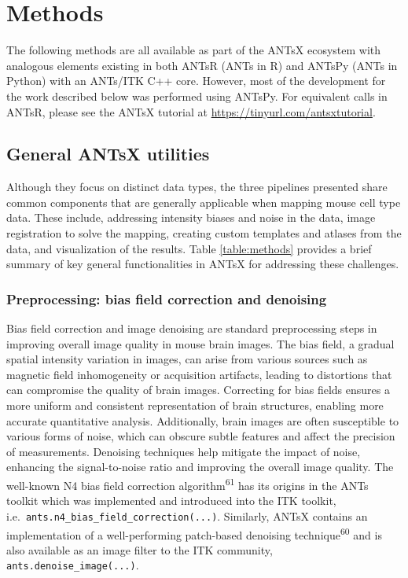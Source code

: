 \documentclass[
  12pt,
]{article}
\begin{document}
\clearpage
\newpage

\section{Methods}\label{methods}

The following methods are all available as part of the ANTsX ecosystem
with analogous elements existing in both ANTsR (ANTs in R) and ANTsPy
(ANTs in Python) with an ANTs/ITK C++ core. However, most of the
development for the work described below was performed using ANTsPy. For
equivalent calls in ANTsR, please see the ANTsX tutorial at
\url{https://tinyurl.com/antsxtutorial}.

\subsection{General ANTsX utilities}\label{general-antsx-utilities}

Although they focus on distinct data types, the three pipelines
presented share common components that are generally applicable when
mapping mouse cell type data. These include, addressing intensity biases
and noise in the data, image registration to solve the mapping, creating
custom templates and atlases from the data, and visualization of the
results. Table \ref{table:methods} provides a brief summary of key
general functionalities in ANTsX for addressing these challenges.



\subsubsection{Preprocessing: bias field correction and
denoising}\label{preprocessing-bias-field-correction-and-denoising}

Bias field correction and image denoising are standard preprocessing
steps in improving overall image quality in mouse brain images. The bias
field, a gradual spatial intensity variation in images, can arise from
various sources such as magnetic field inhomogeneity or acquisition
artifacts, leading to distortions that can compromise the quality of
brain images. Correcting for bias fields ensures a more uniform and
consistent representation of brain structures, enabling more accurate
quantitative analysis. Additionally, brain images are often susceptible
to various forms of noise, which can obscure subtle features and affect
the precision of measurements. Denoising techniques help mitigate the
impact of noise, enhancing the signal-to-noise ratio and improving the
overall image quality. The well-known N4 bias field correction
algorithm\textsuperscript{61} has its origins in the ANTs toolkit which
was implemented and introduced into the ITK toolkit,
i.e.~\texttt{ants.n4\_bias\_field\_correction(...)}. Similarly, ANTsX
contains an implementation of a well-performing patch-based denoising
technique\textsuperscript{60} and is also available as an image filter
to the ITK community, \texttt{ants.denoise\_image(...)}.
\end{document}
